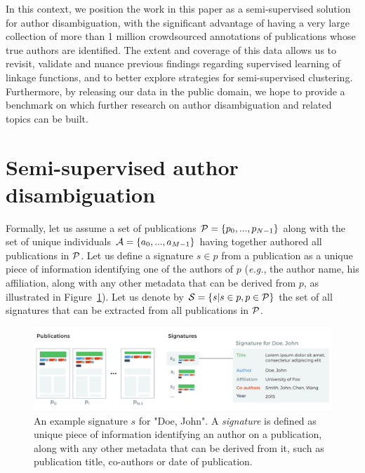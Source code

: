 \documentclass{article}
\newcommand{\eg}{\emph{e.g.}\xspace}
\begin{document}
In this context, we position the work in this paper as a
semi-supervised solution for author disambiguation, with the significant
advantage of having a very large collection of more than 1 million crowdsourced annotations
of publications whose true authors are identified.
The extent and coverage of this data allows us to revisit, validate and nuance previous
findings regarding supervised learning of linkage functions, and to better explore strategies
for semi-supervised clustering.
Furthermore, by releasing our data in the public domain, we hope to provide a benchmark on
which further research on author disambiguation and related topics can be built.




\section{Semi-supervised author disambiguation}
\label{methods}

Formally, let us assume a set of publications ${\cal P} = \{ p_0, ...,
p_{N-1}\}$ along with the set of unique individuals ${\cal A} = \{ a_0, ...,
a_{M-1}\}$ having together authored all publications in ${\cal P}$.  Let us
define a signature $s \in p$ from a publication as a unique piece of
information identifying one of the authors of $p$ (\eg, the author name, his
affiliation, along with any other metadata that can be derived from $p$, as illustrated in Figure~\ref{fig:signature}). Let us
denote by ${\cal S} = \{ s | s \in p, p \in {\cal P} \}$ the set of all
signatures that can be extracted from all publications in ${\cal P}$.

\begin{figure}
\centering
\includegraphics[width=\textwidth]{fig-pub-to-signature}
\caption{An example signature $s$ for "Doe, John". A \textit{signature} is
defined as unique piece of information identifying an author on a publication,
along with any other metadata that can be derived from it, such as publication
title, co-authors or date of publication.}
\label{fig:signature}
\end{figure}
\end{document}
